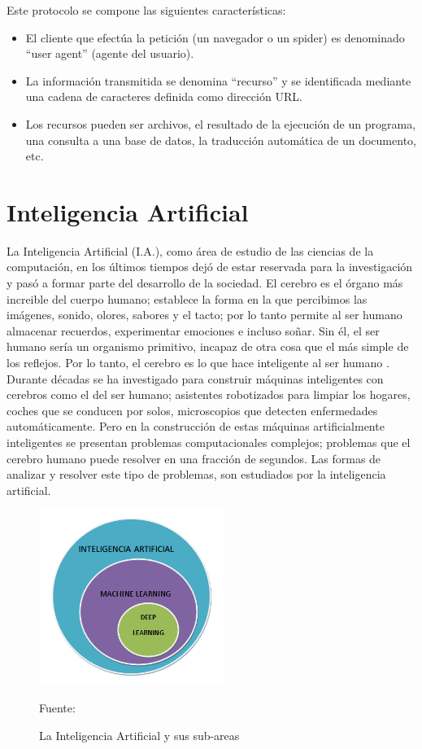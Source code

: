 Este protocolo se compone las siguientes características:
\begin{itemize}
    \item El cliente que efectúa la petición (un navegador o un spider) es denominado ``user agent'' (agente del usuario). 
    \item La información transmitida se denomina ``recurso'' y se identificada mediante una cadena de caracteres definida como dirección URL.
    \item Los recursos pueden ser archivos, el resultado de la ejecución de un programa, una consulta a una base de datos, la traducción automática de un documento, etc.
\end{itemize}

\section{Inteligencia Artificial}
La Inteligencia Artificial (I.A.), como área de estudio de las ciencias de la computación, en los últimos tiempos dejó de estar reservada para la investigación y pasó a formar parte del desarrollo de la sociedad. El cerebro es el órgano más increible del cuerpo humano; establece la forma en la que percibimos las imágenes, sonido, olores, sabores y el tacto; por lo tanto permite al ser humano almacenar recuerdos, experimentar emociones e incluso soñar. Sin él, el ser humano sería un organismo primitivo, incapaz de otra cosa que el más simple de los reflejos. Por lo tanto, el cerebro es lo que hace inteligente al ser humano \cite{intro_ia}.\\

Durante décadas se ha investigado para construir máquinas inteligentes con cerebros como el del ser humano; asistentes robotizados para limpiar los hogares, coches que se conducen por solos, microscopios que detecten enfermedades automáticamente. Pero en la construcción de estas máquinas artificialmente inteligentes se presentan problemas computacionales complejos; problemas que el cerebro humano puede resolver en una fracción de segundos. Las formas de analizar y resolver este tipo de problemas, son estudiados por la inteligencia artificial.\\

\begin{figure}[H]
    \begin{center}
        \includegraphics[width=6cm]{img/capitulo_2/ia.png}
        \caption{La Inteligencia Artificial y sus sub-areas\\}
        Fuente: \cite{ia}
        \label{fig:ia}
    \end{center}
\end{figure}

